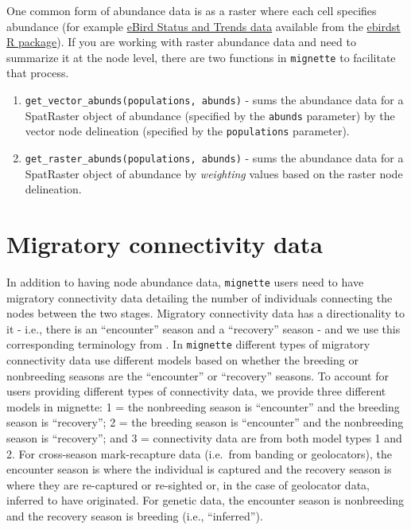 \documentclass[
]{book}
\begin{document}
One common form of abundance data is as a raster where each cell specifies abundance (for example \href{https://science.ebird.org/en/status-and-trends}{eBird Status and Trends data} available from the \href{https://cornelllabofornithology.github.io/ebirdst/}{ebirdst R package}). If you are working with raster abundance data and need to summarize it at the node level, there are two functions in \texttt{mignette} to facilitate that process.

\begin{enumerate}
\def\labelenumi{\arabic{enumi}.}
\item
  \texttt{get\_vector\_abunds(populations,\ abunds)} - sums the abundance data for a SpatRaster object of abundance (specified by the \texttt{abunds} parameter) by the vector node delineation (specified by the \texttt{populations} parameter).
\item
  \texttt{get\_raster\_abunds(populations,\ abunds)} - sums the abundance data for a SpatRaster object of abundance by \emph{weighting} values based on the raster node delineation.
\end{enumerate}

\hypertarget{migratory-connectivity-data}{%
\section{Migratory connectivity data}\label{migratory-connectivity-data}}

In addition to having node abundance data, \texttt{mignette} users need to have migratory connectivity data detailing the number of individuals connecting the nodes between the two stages. Migratory connectivity data has a directionality to it - i.e., there is an ``encounter'' season and a ``recovery'' season - and we use this corresponding terminology from \citep{prochazka2017delineating}. In \texttt{mignette} different types of migratory connectivity data use different models based on whether the breeding or nonbreeding seasons are the ``encounter'' or ``recovery'' seasons. To account for users providing different types of connectivity data, we provide three different models in mignette: 1 = the nonbreeding season is ``encounter'' and the breeding season is ``recovery''; 2 = the breeding season is ``encounter'' and the nonbreeding season is ``recovery''; and 3 = connectivity data are from both model types 1 and 2. For cross-season mark-recapture data (i.e.~from banding or geolocators), the encounter season is where the individual is captured and the recovery season is where they are re-captured or re-sighted or, in the case of geolocator data, inferred to have originated. For genetic data, the encounter season is nonbreeding and the recovery season is breeding (i.e., ``inferred'').
\end{document}
